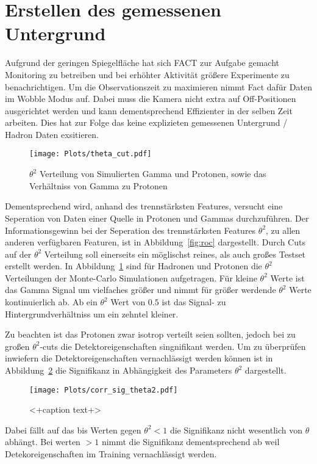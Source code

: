 \section{Erstellen des gemessenen Untergrund}
Aufgrund der geringen Spiegelfläche hat sich FACT zur Aufgabe gemacht Monitoring zu betreiben und bei erhöhter Aktivität größere Experimente zu benachrichtigen.
Um die Observationszeit zu maximieren nimmt Fact dafür Daten im Wobble Modus auf. 
Dabei muss die Kamera nicht extra auf Off-Positionen ausgerichtet werden und kann dementsprechend Effizienter in der selben Zeit arbeiten. 
Dies hat zur Folge das keine explizieten gemessenen Untergrund / Hadron Daten exsitieren. 
\begin{figure}[H]
  \centering
  \texttt{[image: Plots/theta\_cut.pdf]}
  \caption{$\theta^{2}$ Verteilung von Simulierten Gamma und Protonen, sowie das Verhältniss von Gamma zu Protonen}
  \label{fig:thetacut}
\end{figure}
Dementsprechend wird, anhand des trennstärksten Features, versucht eine Seperation von Daten einer Quelle in Protonen und Gammas durchzuführen. 
Der Informationsgewinn bei der Seperation des trennstärksten Features $\theta^{2}$, zu allen anderen verfügbaren Featuren, ist in Abbildung~\ref{fig:roc} dargestellt. 
Durch Cuts auf der $\theta^{2}$ Verteilung soll einerseits ein möglischst reines, als auch großes Testset erstellt werden. 
In Abbildung~\ref{fig:thetacut} sind für Hadronen und Protonen die $\theta^{2}$ Verteilungen der Monte-Carlo Simulationen aufgetragen. 
Für kleine $\theta^{2}$ Werte ist das Gamma Signal um vielfaches größer und nimmt für größer werdende $\theta^{2}$ Werte kontinuierlich ab. 
Ab ein $\theta^{2}$ Wert von $0.5$ ist das Signal- zu Hintergrundverhältniss um ein zehntel kleiner.

Zu beachten ist das Protonen zwar isotrop verteilt seien sollten, jedoch bei zu großen $\theta^{2}$-cuts die Detektoreigenschaften singnifikant werden.
Um zu überprüfen inwiefern die Detektoreigenschaften vernachlässigt werden können ist in Abbildung~\ref{fig:corrtheta} die Signifikanz in Abhängigkeit des Parameters $\theta^{2}$ dargestellt.
\begin{figure}[H]
  \centering
  \texttt{[image: Plots/corr\_sig\_theta2.pdf]}
  \caption{<+caption text+>}
  \label{fig:corrtheta}
\end{figure}
Dabei fällt auf das bis Werten gegen $\theta^{2} < 1$ die Signifikanz nicht wesentlich von $\theta$ abhängt. Bei werten $>1$ nimmt die Signifikanz dementsprechend ab weil Detekoreigenschaften im Training vernachlässigt werden.

